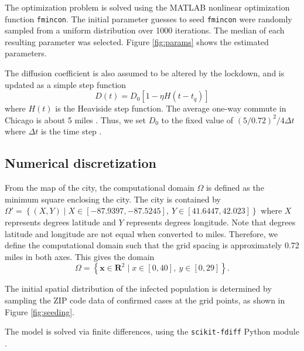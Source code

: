 \documentclass[11pt]{article}
\newcommand{\R}{\mathbf{R}}
\renewcommand\vec{\mathbf}
\begin{document}
		The optimization problem is solved using the MATLAB nonlinear optimization function \verb|fmincon|.
		The initial parameter guesses to seed \verb|fmincon| were randomly sampled from a uniform distribution over 1000 iterations.
		The median of each resulting parameter was selected.
		Figure \ref{fig:params} shows the estimated parameters.
		
		The diffusion coefficient is also assumed to be altered by the lockdown, and is updated as a simple step function
		\begin{equation} \label{eq:diffusion}
			D (t) = D_0 \left[ 1 - \eta H(t - t_q) \right]
		\end{equation}
		where $H(t)$ is the Heaviside step function.
		The average one-way commute in Chicago is about 5 miles \cite{travel}.
		Thus, we set $D_0$ to the fixed value of $(5 / 0.72)^2 / 4 \Delta t$ where $\Delta t$ is the time step \cite{methods}.
	
	\subsection{Numerical discretization}
		From the map of the city, the computational domain $\Omega$ is defined as the minimum square enclosing the city.
		The city is contained by $\Omega' = \left\{ (X,Y) \mid X \in [-87.9397, -87.5245], \ Y \in [41.6447, 42.023] \right\}$ where $X$ represents degrees latitude and $Y$ represents degrees longitude.
		Note that degrees latitude and longitude are not equal when converted to miles.
		Therefore, we define the computational domain such that the grid spacing is approximately 0.72 miles in both axes.
		This gives the domain
		\begin{equation} \label{eq:domain}
			\Omega = \left\{ \vec{x} \in \R^2 \mid x \in [0, 40], \ y \in [0, 29] \right\}.
		\end{equation}
		
		The initial spatial distribution of the infected population is determined by sampling the ZIP code data of confirmed cases \cite{Chicago-zips} at the grid points, as shown in Figure \ref{fig:seeding}.
		
		The model is solved via finite differences, using the \verb|scikit-fdiff| Python module \cite{nicolas_cellier_2019_3236970}.
	
\end{document}
